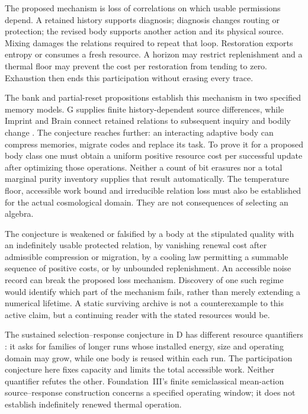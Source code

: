 \documentclass[12pt,a4paper]{article}
\begin{document}
The proposed mechanism is loss of correlations on which usable permissions depend. A retained history supports diagnosis; diagnosis changes routing or protection; the revised body supports another action and its physical source. Mixing damages the relations required to repeat that loop. Restoration exports entropy or consumes a fresh resource. A horizon may restrict replenishment and a thermal floor may prevent the cost per restoration from tending to zero. Exhaustion then ends this participation without erasing every trace.

The bank and partial-reset propositions establish this mechanism in two specified memory models. G supplies finite history-dependent source differences, while Imprint and Brain connect retained relations to subsequent inquiry and bodily change \cite{G,Imprint,Brain}. The conjecture reaches further: an interacting adaptive body can compress memories, migrate codes and replace its task. To prove it for a proposed body class one must obtain a uniform positive resource cost per successful update after optimizing those operations. Neither a count of bit erasures nor a total marginal purity inventory supplies that result automatically. The temperature floor, accessible work bound and irreducible relation loss must also be established for the actual cosmological domain. They are not consequences of selecting an algebra.

The conjecture is weakened or falsified by a body at the stipulated quality with an indefinitely usable protected relation, by vanishing renewal cost after admissible compression or migration, by a cooling law permitting a summable sequence of positive costs, or by unbounded replenishment. An accessible noise record can break the proposed loss mechanism. Discovery of one such regime would identify which part of the mechanism fails, rather than merely extending a numerical lifetime. A static surviving archive is not a counterexample to this active claim, but a continuing reader with the stated resources would be.

The sustained selection--response conjecture in D has different resource
quantifiers \cite{D}: it asks for families of longer runs whose installed
energy, size and operating domain may grow, while one body is reused
within each run. The participation conjecture here fixes capacity and
limits the total accessible work. Neither quantifier refutes the other.
Foundation~III's finite semiclassical mean-action source--response
construction \cite{FoundationIII} concerns a specified operating window;
it does not establish indefinitely renewed thermal operation.
\end{document}
